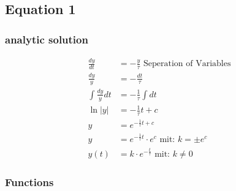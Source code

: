 \subsection{Equation 1}
\subsubsection{analytic solution}
\begin{align}
    \frac{dy}{dt}&=-\frac{y}{\tau} \text{  Seperation of Variables}\\
    \frac{dy}{y}&=-\frac{dt}{\tau} \\
    \int\frac{dy}{y} dt&=-\frac{1}{\tau} \int dt \\
    \ln{|y|}&=-\frac{1}{\tau}t+c \\
    y&=e^{-\frac{1}{\tau}t+c} \\
    y&=e^{-\frac{1}{\tau}t}\cdot e^{c} \text{ mit: } k=\pm e^c\\
    y(t)&=k\cdot e^{-\frac{t}{\tau}}\text{ mit: } k\neq0
\end{align}

\subsubsection{Functions}


